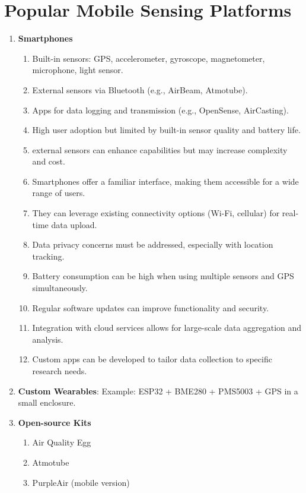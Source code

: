 \documentclass[12pt,a4paper]{article}
\begin{document}
\section*{Popular Mobile Sensing Platforms}

\begin{enumerate}
    \item \textbf{Smartphones}

          \begin{enumerate}
              \item Built-in sensors: GPS, accelerometer, gyroscope, magnetometer, microphone, light sensor.
              \item External sensors via Bluetooth (e.g., AirBeam, Atmotube).
              \item Apps for data logging and transmission (e.g., OpenSense, AirCasting).
              \item High user adoption but limited by built-in sensor quality and battery life.
              \item external sensors can enhance capabilities but may increase complexity and cost.
              \item Smartphones offer a familiar interface, making them accessible for a wide range of users.
              \item They can leverage existing connectivity options (Wi-Fi, cellular) for real-time data upload.
              \item Data privacy concerns must be addressed, especially with location tracking.
              \item Battery consumption can be high when using multiple sensors and GPS simultaneously.
              \item Regular software updates can improve functionality and security.
              \item Integration with cloud services allows for large-scale data aggregation and analysis.
              \item Custom apps can be developed to tailor data collection to specific research needs.
          \end{enumerate}

    \item \textbf{Custom Wearables}: Example: ESP32 + BME280 + PMS5003 + GPS in a small enclosure.

    \item \textbf{Open-source Kits}
          \begin  {enumerate}
    \item Air Quality Egg
    \item Atmotube
    \item PurpleAir (mobile version)
\end{enumerate}


\end{enumerate}
\end{document}
